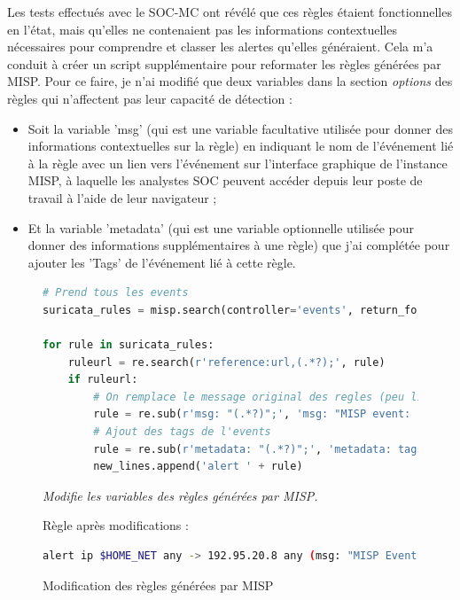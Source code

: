 \vspace{1em}

Les tests effectués avec le SOC-MC ont révélé que ces règles étaient fonctionnelles en l'état, mais qu'elles ne contenaient pas les informations contextuelles nécessaires pour comprendre et classer les alertes qu'elles généraient. Cela m'a conduit à créer un script supplémentaire pour reformater les règles générées par MISP. Pour ce faire, je n'ai modifié que deux variables dans la section \textit{options} des règles qui n'affectent pas leur capacité de détection :\\

\newpage

\begin{itemize}[itemsep=1em]
    \item[•] Soit la variable 'msg' (qui est une variable facultative utilisée pour donner des informations contextuelles sur la règle) en indiquant le nom de l'événement lié à la règle avec un lien vers l'événement sur l'interface graphique de l'instance MISP, à laquelle les analystes SOC peuvent accéder depuis leur poste de travail à l'aide de leur navigateur ;
    \item[•] Et la variable 'metadata' (qui est une variable optionnelle utilisée pour donner des informations supplémentaires à une règle) que j'ai complétée pour ajouter les 'Tags' de l'événement lié à cette règle.\\
\end{itemize}

\begin{figure}[h]%
    \center%
\begin{lstlisting}[language=Python]
# Prend tous les events
suricata_rules = misp.search(controller='events', return_format="suricata")

for rule in suricata_rules:
    ruleurl = re.search(r'reference:url,(.*?);', rule)
    if ruleurl:
        # On remplace le message original des regles (peu lisible et trop long) par un message simple renvoyant vers la pages MISP de l'Event
        rule = re.sub(r'msg: "(.*?)";', 'msg: "MISP event: ' + ruleurl.group(1) + '";', rule)
        # Ajout des tags de l'events
        rule = re.sub(r'metadata: "(.*?)";', 'metadata: tags ' + eventTags + '";', rule)
        new_lines.append('alert ' + rule)
\end{lstlisting}
{\small
    \textit{Modifie les variables des règles générées par MISP.}
}

\vspace{1em}
Règle après modifications :
\vspace{0.5em}
\begin{lstlisting}[language=bash]
alert ip $HOME_NET any -> 192.95.20.8 any (msg: "MISP Event : MAR-10382254.r1.v1: XMRIG Cryptominer https://192.168.215.128/events/view/128"; classtype:trojan-activity; sid:2696602; rev:1; priority:4; reference:url,https://192.168.215.128/events/view/128; metadata: tags tlp:white|cryptominer;)
\end{lstlisting}
    \caption[Modification des règles générées par MISP]{Modification des règles générées par MISP}\label{fig:ModifRulesMISP}
\end{figure}

